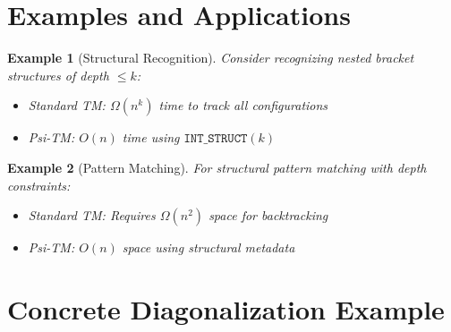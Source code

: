 \documentclass[11pt]{article}
\newtheorem{example}{Example}
\begin{document}
\section{Examples and Applications}

\begin{example}[Structural Recognition]
Consider recognizing nested bracket structures of depth $\leq k$:
\begin{itemize}
\item Standard TM: $\Omega(n^k)$ time to track all configurations
\item Psi-TM: $O(n)$ time using $\texttt{INT\_STRUCT}(k)$
\end{itemize}
\end{example}

\begin{example}[Pattern Matching]
For structural pattern matching with depth constraints:
\begin{itemize}
\item Standard TM: Requires $\Omega(n^2)$ space for backtracking
\item Psi-TM: $O(n)$ space using structural metadata
\end{itemize}
\end{example}


\section{Concrete Diagonalization Example}
\end{document}
